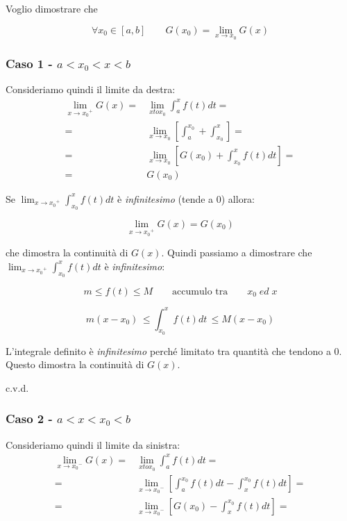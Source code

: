 \documentclass[../dimostrazioni]{subfiles}
\begin{document}
                Voglio dimostrare che 

                \[\forall x_0 \in [a, b] \qquad G(x_0) = \lim_{x \to  x_0} G(x) \]
            
                \subsubsection*{Caso 1 - \(a < x_0 < x < b \)}
                    Consideriamo quindi il limite da destra:
                    \begin{align*}
                        \lim_{x \to {x_0}^{+}}G(x) =& \lim_{x to x_0}{\int_{a}^{x}f(t) dt} = \\
                        =& \lim_{x \to x_0} \left[ \int_{a}^{x_0} + \int_{x_0}^{x} \right] = \\
                        =& \lim_{x \to x_0} \left[ G(x_0) + \int_{x_0}^{x} f(t) dt \right] = \\
                        =& G(x_0)
                    \end{align*}

                    Se \( \lim_{x \to {x_0}^{+}} \int_{x_0}^{x} f(t) dt \) è \emph{infinitesimo} (tende a 0) allora:

                    \[  \lim_{x \to {x_0}^{+}}G(x) = G(x_0) \]

                    che dimostra la continuità di \(G(x)\). Quindi passiamo a dimostrare che \( \lim_{x \to {x_0}^{+}} \int_{x_0}^{x} f(t) dt \) è \emph{infinitesimo}:

                    \[m \leqslant f(t) \leqslant M \qquad \text {accumulo tra} \qquad x_0 \; ed \; x \]

                    \[m(x-x_0) \, \leqslant \int_{x_0}^{x} f(t) dt \, \leqslant M(x-x_0) \]

                    L'integrale definito è \emph{infinitesimo} perché limitato tra quantità che tendono a 0. Questo dimostra la continuità di \(G(x)\).

                    c.v.d.
                
                \subsubsection*{Caso 2 - \(a < x < x_0 < b \)}
                    Consideriamo quindi il limite da sinistra:
                    \begin{align*}
                        \lim_{x \to {x_0}^{-}}G(x) =& \lim_{x to x_0}{\int_{a}^{x}f(t) dt} = \\
                        =& \lim_{x \to {x_0}^{-}} \left[ \int_{a}^{x_0}f(t) dt - \int_{x}^{x_0}f(t) dt \right] = \\
                        =& \lim_{x \to {x_0}^{-}} \left[ G(x_0) - \int_{x}^{x_0} f(t) dt \right] =
                    \end{align*}
\end{document}
